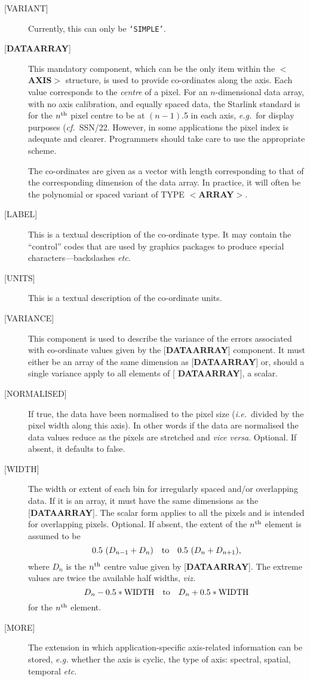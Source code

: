 \documentclass[twoside,11pt]{article}
\newcommand{\xref}[3]{#1}
\renewcommand{\_}{\texttt{\symbol{95}}}
\begin{document}
\begin{description}
\item [{[}VARIANT{]}]
Currently, this can only be {\tt `SIMPLE'}.
\item [{[}{\bf DATA\_ARRAY}{]}]
This mandatory component, which
can be the only item within the $<${\bf AXIS}$>$ structure,
is used to provide co-ordinates along the axis.
Each value corresponds to the {\it centre} of a pixel.  For an
$n$-dimensional data array, with no axis calibration, and equally spaced
data, the Starlink standard is for the $n^{\rm th}$ pixel centre to be at
$(n-1)$.5 in each axis, {\it e.g.}\  for display purposes
({\it cf.}\  \xref{SSN/22}{ssn22}). However, in some applications the pixel
index is adequate and clearer.  Programmers should take care to use
the appropriate scheme.

The co-ordinates are given as
a vector with length corresponding to that of the corresponding
dimension of the data array. In practice, it will often be
the polynomial or spaced variant of TYPE \mbox{$<${\bf ARRAY}$>$}.

\item [{[}LABEL{]}]
This is a textual description of the co-ordinate type.  It may
contain the ``control'' codes that are used by graphics packages
to produce special characters---backslashes {\it etc}.
\item [{[}UNITS{]}]
This is a textual description of the co-ordinate units.
\item [{[}VARIANCE{]}]
This component is used to describe the variance of the
errors associated with co-ordinate
values given by the {[}{\bf DATA\_ARRAY}{]} component.
It must either be an array of
the same dimension as {[}{\bf DATA\_ARRAY}{]} or,
should a single variance apply to all elements of {[}{\bf 
DATA\_ARRAY}{]},
a scalar.
\item [{[}NORMALISED{]}]
If true, the data have been normalised to the pixel size
({\it i.e.}\ divided by the pixel width along this axis).
In other words if the data are 
normalised the data values reduce as the pixels are stretched and {\it 
vice versa}. Optional. If absent, it defaults to false.
\item [{[}WIDTH{]}]
The width or extent of each bin for irregularly spaced
and/or overlapping data.
If it is an array, it must have
the same dimensions as the {[}{\bf DATA\_ARRAY}{]}.
The scalar form applies to all the pixels and is intended for overlapping
pixels.  Optional.  If absent, the extent of the $n^{\rm th}$
element is assumed to be
\[ 0.5~(D_{n-1}+D_n)~~~{\rm to}~~~0.5~(D_n+D_{n+1}) , \]
where $D_n$ is the $n^{\rm th}$ centre
value given by {[}{\bf DATA\_ARRAY}{]}. The
extreme values are twice the available half widths, {\it viz.}
\[ D_n - 0.5 * {\rm WIDTH} ~~~ {\rm to} ~~~ D_n + 0.5 * {\rm WIDTH} \]
for the $n^{\rm th}$ element.
\item [{[}MORE{]}] The extension in which application-specific
axis-related information can be stored,
{\it e.g.} whether the axis is cyclic, the type of axis: spectral,
spatial, temporal {\it etc.}
\end{description}
\end{document}
